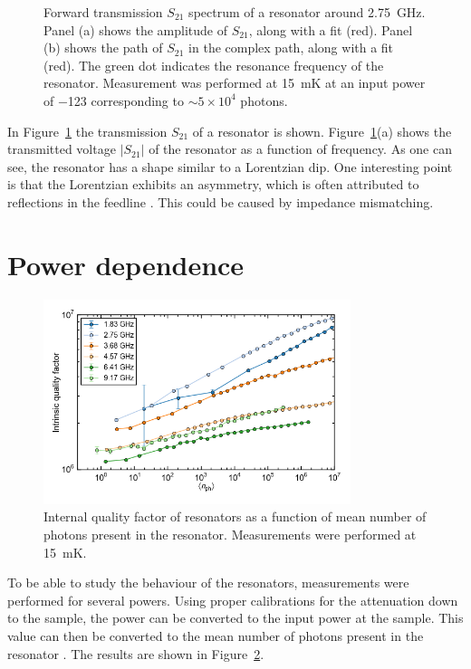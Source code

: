 \begin{figure}[h]
\begin{subfigure}[b]{.49\textwidth}
    \end{subfigure}
    \caption{Forward transmission $S_{21}$ spectrum of a resonator around \SI{2.75}{\giga \hertz}. Panel (a) shows the amplitude of $S_{21}$, along with a fit (red). Panel (b) shows the path of $S_{21}$ in the complex path, along with a fit (red). The green dot indicates the resonance frequency of the resonator.  Measurement was performed at \SI{15}{\milli \kelvin} at an input power of \SI{-123}{\dBm} corresponding to $\sim 5 \times 10^4$ photons.}
    \label{fig:resonator}
\end{figure}

 In Figure~\ref{fig:resonator} the transmission $S_{21}$ of a resonator is shown. Figure~\ref{fig:resonator}(a) shows the transmitted voltage $|S_{21}|$ of the resonator as a function of frequency. As one can see, the resonator has a shape similar to a Lorentzian dip. One interesting point is that the Lorentzian exhibits an asymmetry, which is often attributed to reflections in the feedline \cite[p192]{Geerlings}. This could be caused by impedance mismatching.


\section{Power dependence}
\label{sec:resonator:results:power_dependence}

\begin{figure}
    \centering
    \includegraphics[width=0.8\textwidth]{Figures/DRIE/Qi_vs_n_photon.png}
    \caption{Internal quality factor of resonators as a function of mean number of photons present in the resonator. Measurements were performed at \SI{15}{\milli \kelvin}.}
    \label{fig:Qi_vs_n_photon}
\end{figure}
To be able to study the behaviour of the resonators, measurements were performed for several powers. Using proper calibrations for the attenuation down to the sample, the power can be converted to the input power at the sample. This value can then be converted to the mean number of photons present in the resonator \cite{bruno2015reducing}. The results are shown in Figure~\ref{fig:Qi_vs_n_photon}.

